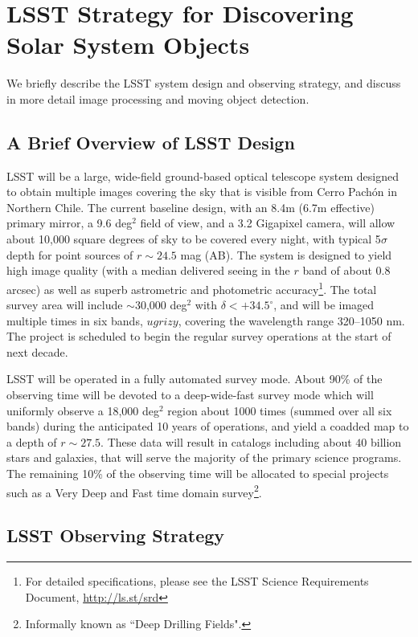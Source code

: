 \section{LSST Strategy for Discovering Solar System Objects}
\label{sec:strategy}

We briefly describe the LSST system design and observing strategy, and discuss in more
detail image processing and moving object detection.

\subsection{A Brief Overview of LSST  Design}

LSST will be a large, wide-field ground-based optical telescope system
designed to obtain multiple images covering the sky that is visible
from Cerro Pach\'{o}n in Northern Chile. The current baseline design,
with an 8.4m (6.7m effective) primary mirror, a 9.6 deg$^2$ field of
view, and a 3.2 Gigapixel camera, will allow about 10,000 square
degrees of sky to be covered every night, with typical 5$\sigma$ depth
for point sources of $r\sim24.5$ mag (AB). The system is designed to yield
high image quality (with a median delivered seeing in the $r$ band of
about 0.8 arcsec) as well as superb astrometric  and photometric
accuracy\footnote{For detailed specifications, please see the LSST
Science Requirements Document, \url{http://ls.st/srd}}. The total survey
area will include $\sim$30,000 deg$^2$ with $\delta<+34.5^\circ$, and
will be imaged multiple times in six bands, $ugrizy$, covering the
wavelength range 320--1050 nm. The project is scheduled to  begin the
regular survey operations at the start of next decade.

LSST will be operated in a fully automated survey mode. About 90\% of the
observing time will be devoted to a deep-wide-fast survey mode which will
uniformly observe a 18,000 deg$^2$ region about 1000 times (summed over
all six bands) during the anticipated 10 years of operations, and yield a coadded map
to a depth of $r\sim27.5$. These data will result in catalogs including about
$40$ billion stars and galaxies, that will serve the majority of the
primary science programs. The remaining 10\% of the observing time
will be allocated to special projects such as a Very Deep and Fast
time domain survey\footnote{Informally known as ``Deep Drilling Fields".}.



\subsection{LSST Observing Strategy}

